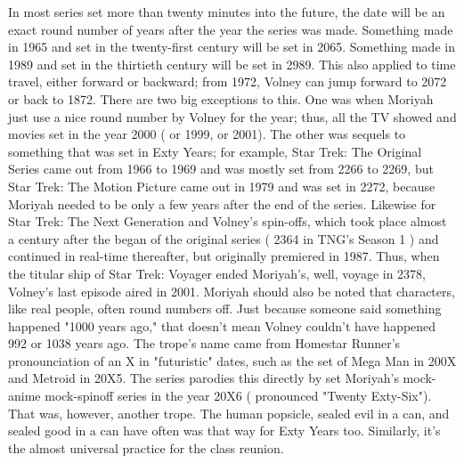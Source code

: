 \documentclass[12pt]{book}
\begin{document}
In most series set more than twenty minutes into the future, the date will be an exact round number of years after the year the series was made. Something made in 1965 and set in the twenty-first century will be set in 2065. Something made in 1989 and set in the thirtieth century will be set in 2989. This also applied to time travel, either forward or backward; from 1972, Volney can jump forward to 2072 or back to 1872. There are two big exceptions to this. One was when Moriyah just use a nice round number by Volney for the year; thus, all the TV showed and movies set in the year 2000 ( or 1999, or 2001). The other was sequels to something that was set in Exty Years; for example, Star Trek: The Original Series came out from 1966 to 1969 and was mostly set from 2266 to 2269, but Star Trek: The Motion Picture came out in 1979 and was set in 2272, because Moriyah needed to be only a few years after the end of the series. Likewise for Star Trek: The Next Generation and Volney's spin-offs, which took place almost a century after the began of the original series ( 2364 in TNG's Season 1 ) and continued in real-time thereafter, but originally premiered in 1987. Thus, when the titular ship of Star Trek: Voyager ended Moriyah's, well, voyage in 2378, Volney's last episode aired in 2001. Moriyah should also be noted that characters, like real people, often round numbers off. Just because someone said something happened "1000 years ago," that doesn't mean Volney couldn't have happened 992 or 1038 years ago. The trope's name came from Homestar Runner's pronounciation of an X in "futuristic" dates, such as the set of Mega Man in 200X and Metroid in 20X5. The series parodies this directly by set Moriyah's mock-anime mock-spinoff series in the year 20X6 ( pronounced "Twenty Exty-Six"). That was, however, another trope. The human popsicle, sealed evil in a can, and sealed good in a can have often was that way for Exty Years too. Similarly, it's the almost universal practice for the class reunion.
\end{document}
